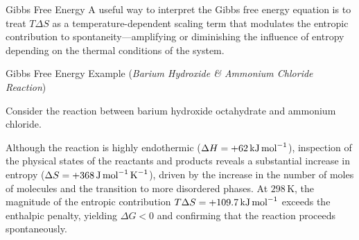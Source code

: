 \documentclass[10pt]{article}
\begin{document}
\begin{core}[label=core:gibbs]{Gibbs Free Energy}
      A useful way to interpret the Gibbs free energy equation is to treat $T\Delta S$ as a temperature-dependent scaling term that modulates the entropic contribution to spontaneity---amplifying or diminishing the influence of entropy depending on the thermal conditions of the system.

    \end{core}

    \begin{core}{Gibbs Free Energy Example (\textit{Barium Hydroxide \& Ammonium Chloride Reaction})}

      Consider the reaction between barium hydroxide octahydrate and ammonium chloride.


      Although the reaction is highly endothermic ($\Delta H = +62\,\text{kJ\,mol}^{-1}$), inspection of the physical states of the reactants and products reveals a substantial increase in entropy ($\Delta S = +368\,\text{J\,mol}^{-1}\,\text{K}^{-1}$), driven by the increase in the number of moles of molecules and the transition to more disordered phases. At $298\,\text{K}$, the magnitude of the entropic contribution $T\Delta S = +109.7\,\text{kJ\,mol}^{-1}$ exceeds the enthalpic penalty, yielding $\Delta G < 0$ and confirming that the reaction proceeds spontaneously.

    \end{core}
\end{document}
